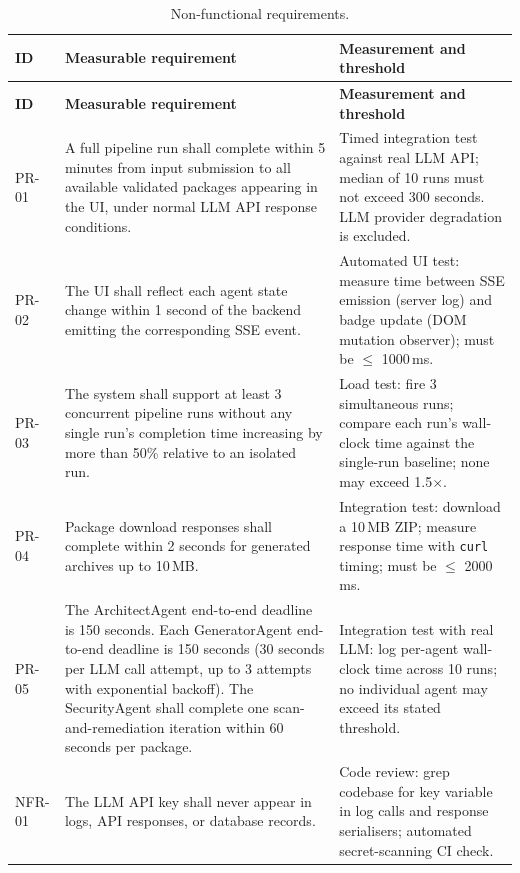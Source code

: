 \begin{longtable}{@{}p{}p{}p{}@{}}
\caption{Non-functional requirements.}\label{tab:nonfunctional-requirements}\\
\toprule
\textbf{ID} & \textbf{Measurable requirement} & \textbf{Measurement and threshold} \\
\midrule
\endfirsthead
\toprule
\textbf{ID} & \textbf{Measurable requirement} & \textbf{Measurement and threshold} \\
\midrule
\endhead

PR-01 & A full pipeline run shall complete within 5 minutes from input
  submission to all available validated packages appearing in the UI,
  under normal LLM API response conditions. &
  Timed integration test against real LLM API; median of 10 runs must
  not exceed 300 seconds. LLM provider degradation is excluded. \\

PR-02 & The UI shall reflect each agent state change within 1 second of
  the backend emitting the corresponding SSE event. &
  Automated UI test: measure time between SSE emission (server log) and
  badge update (DOM mutation observer); must be $\leq$ 1000\,ms. \\

PR-03 & The system shall support at least 3 concurrent pipeline runs without
  any single run's completion time increasing by more than 50\% relative
  to an isolated run. &
  Load test: fire 3 simultaneous runs; compare each run's wall-clock
  time against the single-run baseline; none may exceed 1.5$\times$. \\

PR-04 & Package download responses shall complete within 2 seconds for
  generated archives up to 10\,MB. &
  Integration test: download a 10\,MB ZIP; measure response time with
  \texttt{curl} timing; must be $\leq$ 2000\,ms. \\

PR-05 & The ArchitectAgent end-to-end deadline is 150 seconds. Each
  GeneratorAgent end-to-end deadline is 150 seconds (30 seconds per LLM
  call attempt, up to 3 attempts with exponential backoff). The SecurityAgent
  shall complete one scan-and-remediation iteration within 60 seconds
  per package. &
  Integration test with real LLM: log per-agent wall-clock time across
  10 runs; no individual agent may exceed its stated threshold. \\

NFR-01 & The LLM API key shall never appear in logs, API responses, or
  database records. &
  Code review: grep codebase for key variable in log calls and response
  serialisers; automated secret-scanning CI check. \\


\end{longtable}
